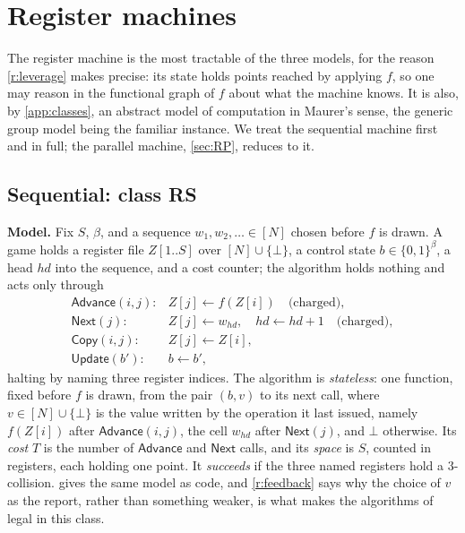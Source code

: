 \documentclass[11pt]{article}
\theoremstyle{plain}
\theoremstyle{definition}
\newcommand{\NN}{[N]}
\newcommand{\Advance}{\mathsf{Advance}}
\newcommand{\Next}{\mathsf{Next}}
\newcommand{\Copy}{\mathsf{Copy}}
\newcommand{\Update}{\mathsf{Update}}
\newcommand{\cls}[1]{\textsf{#1}}   %
\begin{document}
\section{Register machines}\label{sec:R}

The register machine is the most tractable of the three models, for the
reason \cref{r:leverage} makes precise: its state holds points reached by
applying $f$, so one may reason in the functional graph of $f$ about what
the machine knows.  It is also, by \cref{app:classes}, an abstract model of
computation in Maurer's sense, the generic group model being the familiar
instance.  We treat the sequential machine first and in full; the parallel
machine, \cref{sec:RP}, reduces to it.

\subsection{Sequential: class \cls{RS}}\label{sec:reg}

\begin{cbox}
\textbf{Model.}  Fix $S$, $\beta$, and a sequence $w_1, w_2, \dots \in \NN$
chosen before $f$ is drawn.  A game holds a register file $Z[1..S]$ over
$\NN \cup \{\bot\}$, a control state $b \in \{0,1\}^{\beta}$, a head $hd$
into the sequence, and a cost counter; the algorithm holds nothing and acts
only through
\[
  \begin{array}{ll}
  \Advance(i,j)\colon & Z[j] \gets f(Z[i]) \quad\text{(charged)},\\
  \Next(j)\colon      & Z[j] \gets w_{hd},\quad hd \gets hd+1
                        \quad\text{(charged)},\\
  \Copy(i,j)\colon    & Z[j] \gets Z[i],\\
  \Update(b')\colon   & b \gets b' ,
  \end{array}
\]
halting by naming three register indices.  The algorithm is
\emph{stateless}: one function, fixed before $f$ is drawn, from the pair
$(b, v)$ to its next call, where $v \in \NN \cup \{\bot\}$ is the value
written by the operation it last issued, namely $f(Z[i])$ after
$\Advance(i,j)$, the cell $w_{hd}$ after $\Next(j)$, and $\bot$ otherwise.
Its \emph{cost} $T$ is the number of $\Advance$ and $\Next$ calls, and its
\emph{space} is $S$, counted in registers, each holding one point.  It
\emph{succeeds} if the three named registers hold a $3$-collision.
 gives the same model as code, and \cref{r:feedback} says
why the choice of $v$ as the report, rather than something weaker, is what
makes the algorithms of~\cite{JL09,OW99} legal in this class.
\end{cbox}
\end{document}
